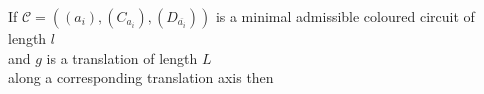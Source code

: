 \documentclass[preview]{standalone}
\begin{document}
\begin{center}
{If $\mathcal{C} = ((a_i), (C_{a_i}), (D_{\overline{a_i}}))$ is a minimal admissible coloured circuit of length $l$  \\ and $g$ is a translation of length $L$ \\ along a corresponding translation axis then}
\end{center}
\end{document}
